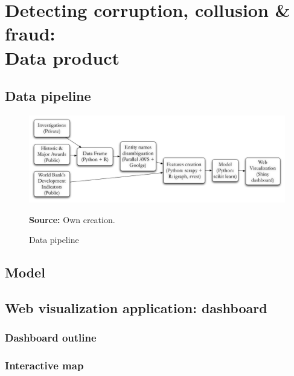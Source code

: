\chapter{Detecting corruption, collusion \& fraud:\\ Data product}\label{chap_prod}



\section{Data pipeline}
\begin{figure}[H]
\begin{center}
\caption{Data pipeline}
\label{fig_pipeline}
\includegraphics[width=\textwidth,height=1\textheight,keepaspectratio]{../img/pipeline.pdf}
\end{center}
\noindent \footnotesize{\textbf{Source:} Own creation.}
\end{figure}





\section{Model}




\section{Web visualization application: dashboard}

\subsection{Dashboard outline}

\subsection{Interactive map}

